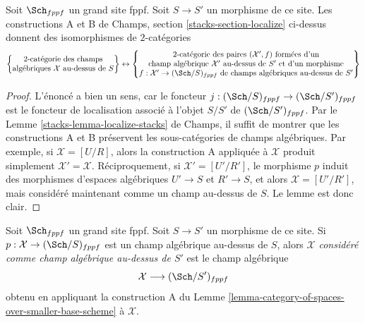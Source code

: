 \begin{lemma}
\label{lemma-category-of-spaces-over-smaller-base-scheme}
Soit $\Sch_{fppf}$ un grand site fppf.
Soit $S \to S'$ un morphisme de ce site.
Les constructions A et B de
Champs, section \ref{stacks-section-localize}
ci-dessus donnent des isomorphismes de $2$-catégories
$$
\left\{
\begin{matrix}
2\text{-catégorie des champs}\\
\text{algébriques }\mathcal{X}\text{ au-dessus de }S
\end{matrix}
\right\}
\leftrightarrow
\left\{
\begin{matrix}
2\text{-catégorie des paires }(\mathcal{X}', f)\text{ formées d'un}\\
\text{champ algébrique }\mathcal{X}'\text{ au-dessus de }S'\text{ et d'un morphisme}\\
f : \mathcal{X}' \to (\Sch/S)_{fppf}\text{ de champs algébriques au-dessus de }S'
\end{matrix}
\right\}
$$
\end{lemma}

\begin{proof}
L'énoncé a bien un sens, car le foncteur
$j : (\Sch/S)_{fppf} \to (\Sch/S')_{fppf}$
est le foncteur de localisation associé à l'objet $S/S'$
de $(\Sch/S')_{fppf}$. Par le
Lemme \ref{stacks-lemma-localize-stacks} de Champs,
il suffit de montrer que les constructions A et B
préservent les sous-catégories de champs algébriques.
Par exemple, si $\mathcal{X} = [U/R]$, alors la construction A
appliquée à $\mathcal{X}$ produit simplement
$\mathcal{X}' = \mathcal{X}$. Réciproquement, si $\mathcal{X}' = [U'/R']$,
le morphisme $p$ induit des morphismes d'espaces algébriques
$U' \to S$ et $R' \to S$, et alors $\mathcal{X} = [U'/R']$,
mais considéré maintenant comme un champ au-dessus de $S$. Le lemme est donc clair.
\end{proof}

\begin{definition}
\label{definition-viewed-as}
Soit $\Sch_{fppf}$ un grand site fppf.
Soit $S \to S'$ un morphisme de ce site.
Si $p : \mathcal{X} \to (\Sch/S)_{fppf}$
est un champ algébrique au-dessus de $S$, alors
$\mathcal{X}$ {\it considéré comme champ algébrique au-dessus de $S'$}
est le champ algébrique
$$
\mathcal{X} \longrightarrow (\Sch/S')_{fppf}
$$
obtenu en appliquant la construction A du
Lemme \ref{lemma-category-of-spaces-over-smaller-base-scheme}
à $\mathcal{X}$.
\end{definition}

